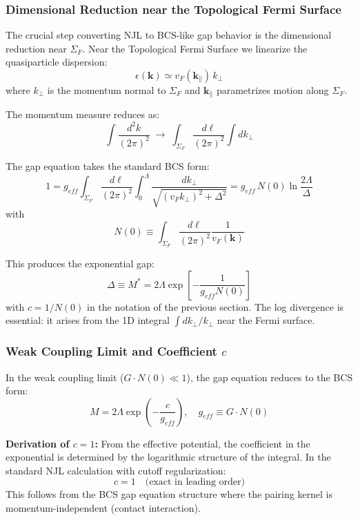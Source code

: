 \documentclass[a4paper,12pt]{article}
\begin{document}
\subsubsection{Dimensional Reduction near the Topological Fermi Surface}

The crucial step converting NJL to BCS-like gap behavior is the dimensional reduction near $\Sigma_F$. Near the Topological Fermi Surface we linearize the quasiparticle dispersion:
\begin{equation}
\epsilon(\mathbf{k}) \simeq v_F(\mathbf{k}_\parallel) \, k_\perp
\end{equation}
where $k_\perp$ is the momentum normal to $\Sigma_F$ and $\mathbf{k}_\parallel$ parametrizes motion along $\Sigma_F$.

The momentum measure reduces as:
\begin{equation}
\int \frac{d^2k}{(2\pi)^2} \;\to\; \int_{\Sigma_F} \frac{d\ell}{(2\pi)^2} \int dk_\perp
\end{equation}

The gap equation takes the standard BCS form:
\begin{equation}
1 = g_{eff} \int_{\Sigma_F} \frac{d\ell}{(2\pi)^2} \int_0^\Lambda \frac{dk_\perp}{\sqrt{(v_F k_\perp)^2 + \Delta^2}} = g_{eff} \, N(0) \ln\frac{2\Lambda}{\Delta}
\end{equation}
with
\begin{equation}
N(0) \equiv \int_{\Sigma_F} \frac{d\ell}{(2\pi)^2} \frac{1}{v_F(\mathbf{k})}
\end{equation}

This produces the exponential gap:
\begin{equation}
\Delta \equiv M^* = 2\Lambda \exp\left[-\frac{1}{g_{eff} N(0)}\right]
\end{equation}
with $c = 1/N(0)$ in the notation of the previous section. The log divergence is essential: it arises from the 1D integral $\int dk_\perp/k_\perp$ near the Fermi surface.

\subsubsection{Weak Coupling Limit and Coefficient $c$}
In the weak coupling limit ($G \cdot N(0) \ll 1$), the gap equation reduces to the BCS form:
\begin{equation}
M = 2\Lambda \exp\left(-\frac{c}{g_{eff}}\right), \quad g_{eff} \equiv G \cdot N(0)
\end{equation}

\textbf{Derivation of $c = 1$:}
From the effective potential, the coefficient in the exponential is determined by the logarithmic structure of the integral. In the standard NJL calculation with cutoff regularization:
\begin{equation}
c = 1 \quad \text{(exact in leading order)}
\end{equation}
This follows from the BCS gap equation structure where the pairing kernel is momentum-independent (contact interaction).
\end{document}
